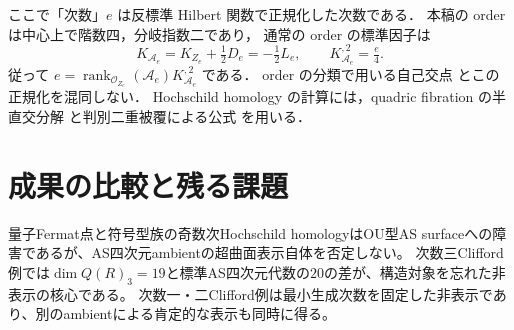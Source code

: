 \documentclass[11pt,a4paper]{ltjsarticle}
\theoremstyle{definition}
\newcommand{\rk}{\operatorname{rank}}
\begin{document}
ここで「次数」$e$ は反標準 Hilbert 関数で正規化した次数である．
本稿の order は中心上で階数四，分岐指数二であり，
通常の order の標準因子は
\[
 K_{\mathcal A_e}=K_{Z_e}+\tfrac12D_e=-\tfrac12L_e,
 \qquad K_{\mathcal A_e}^{,2}=\tfrac e4.
\]
従って $e=\rk_{\mathcal O_{Z_e}}(\mathcal A_e)K_{\mathcal A_e}^{,2}$ である．
order の分類で用いる自己交点 \cite{Nasr2020} とこの正規化を混同しない．
Hochschild homology の計算には，quadric fibration の半直交分解
\cite{KuznetsovQuadric} と判別二重被覆による公式 \cite{KuznetsovHH} を用いる．







\section{成果の比較と残る課題}
量子Fermat点と符号型族の奇数次Hochschild homologyはOU型AS surfaceへの障害であるが、AS四次元ambientの超曲面表示自体を否定しない。
次数三Clifford例では$\dim Q(R)_3=19$と標準AS四次元代数の$20$の差が、構造対象を忘れた非表示の核心である。
次数一・二Clifford例は最小生成次数を固定した非表示であり、別のambientによる肯定的な表示も同時に得る。
\end{document}
